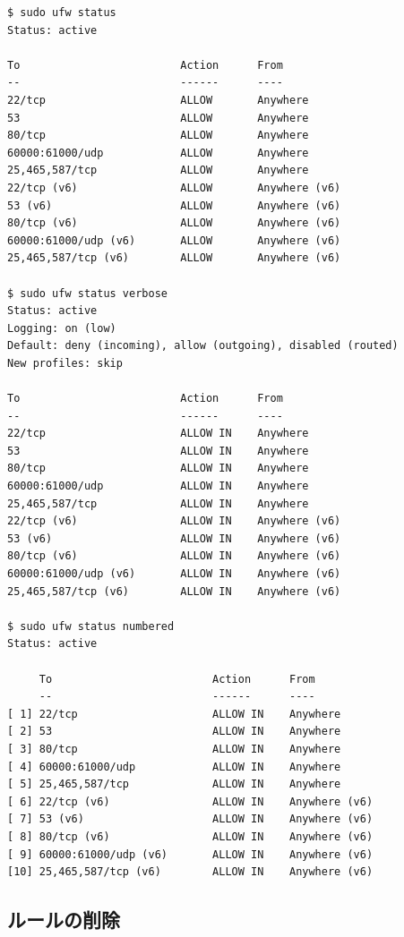 \documentclass[mingoth,a4paper]{jsarticle}
\begin{document}
\begin{verbatim}
$ sudo ufw status
Status: active

To                         Action      From
--                         ------      ----
22/tcp                     ALLOW       Anywhere
53                         ALLOW       Anywhere
80/tcp                     ALLOW       Anywhere
60000:61000/udp            ALLOW       Anywhere
25,465,587/tcp             ALLOW       Anywhere
22/tcp (v6)                ALLOW       Anywhere (v6)
53 (v6)                    ALLOW       Anywhere (v6)
80/tcp (v6)                ALLOW       Anywhere (v6)
60000:61000/udp (v6)       ALLOW       Anywhere (v6)
25,465,587/tcp (v6)        ALLOW       Anywhere (v6)

$ sudo ufw status verbose
Status: active
Logging: on (low)
Default: deny (incoming), allow (outgoing), disabled (routed)
New profiles: skip

To                         Action      From
--                         ------      ----
22/tcp                     ALLOW IN    Anywhere
53                         ALLOW IN    Anywhere
80/tcp                     ALLOW IN    Anywhere
60000:61000/udp            ALLOW IN    Anywhere
25,465,587/tcp             ALLOW IN    Anywhere
22/tcp (v6)                ALLOW IN    Anywhere (v6)
53 (v6)                    ALLOW IN    Anywhere (v6)
80/tcp (v6)                ALLOW IN    Anywhere (v6)
60000:61000/udp (v6)       ALLOW IN    Anywhere (v6)
25,465,587/tcp (v6)        ALLOW IN    Anywhere (v6)

$ sudo ufw status numbered
Status: active

     To                         Action      From
     --                         ------      ----
[ 1] 22/tcp                     ALLOW IN    Anywhere
[ 2] 53                         ALLOW IN    Anywhere
[ 3] 80/tcp                     ALLOW IN    Anywhere
[ 4] 60000:61000/udp            ALLOW IN    Anywhere
[ 5] 25,465,587/tcp             ALLOW IN    Anywhere
[ 6] 22/tcp (v6)                ALLOW IN    Anywhere (v6)
[ 7] 53 (v6)                    ALLOW IN    Anywhere (v6)
[ 8] 80/tcp (v6)                ALLOW IN    Anywhere (v6)
[ 9] 60000:61000/udp (v6)       ALLOW IN    Anywhere (v6)
[10] 25,465,587/tcp (v6)        ALLOW IN    Anywhere (v6)
\end{verbatim}

\subsection{ルールの削除}
\end{document}

